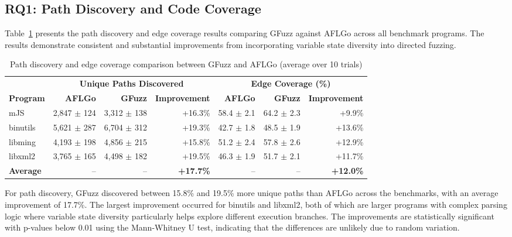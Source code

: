 \documentclass[review]{elsarticle}
\begin{document}
\subsection{RQ1: Path Discovery and Code Coverage}

Table~\ref{tab:coverage} presents the path discovery and edge coverage results comparing GFuzz against AFLGo across all benchmark programs. The results demonstrate consistent and substantial improvements from incorporating variable state diversity into directed fuzzing.

\begin{table}[t]
\centering
\caption{Path discovery and edge coverage comparison between GFuzz and AFLGo (average over 10 trials)}
\label{tab:coverage}
\begin{tabular}{lrrrrrr}
\toprule
& \multicolumn{3}{c}{\textbf{Unique Paths Discovered}} & \multicolumn{3}{c}{\textbf{Edge Coverage (\%)}} \\
\cmidrule(lr){2-4} \cmidrule(lr){5-7}
\textbf{Program} & \textbf{AFLGo} & \textbf{GFuzz} & \textbf{Improvement} & \textbf{AFLGo} & \textbf{GFuzz} & \textbf{Improvement} \\
\midrule
mJS & 2,847 $\pm$ 124 & 3,312 $\pm$ 138 & +16.3\% & 58.4 $\pm$ 2.1 & 64.2 $\pm$ 2.3 & +9.9\% \\
binutils & 5,621 $\pm$ 287 & 6,704 $\pm$ 312 & +19.3\% & 42.7 $\pm$ 1.8 & 48.5 $\pm$ 1.9 & +13.6\% \\
libming & 4,193 $\pm$ 198 & 4,856 $\pm$ 215 & +15.8\% & 51.2 $\pm$ 2.4 & 57.8 $\pm$ 2.6 & +12.9\% \\
libxml2 & 3,765 $\pm$ 165 & 4,498 $\pm$ 182 & +19.5\% & 46.3 $\pm$ 1.9 & 51.7 $\pm$ 2.1 & +11.7\% \\
\midrule
\textbf{Average} & -- & -- & \textbf{+17.7\%} & -- & -- & \textbf{+12.0\%} \\
\bottomrule
\end{tabular}
\end{table}

For path discovery, GFuzz discovered between 15.8\% and 19.5\% more unique paths than AFLGo across the benchmarks, with an average improvement of 17.7\%. The largest improvement occurred for binutils and libxml2, both of which are larger programs with complex parsing logic where variable state diversity particularly helps explore different execution branches. The improvements are statistically significant with p-values below 0.01 using the Mann-Whitney U test, indicating that the differences are unlikely due to random variation.
\end{document}

